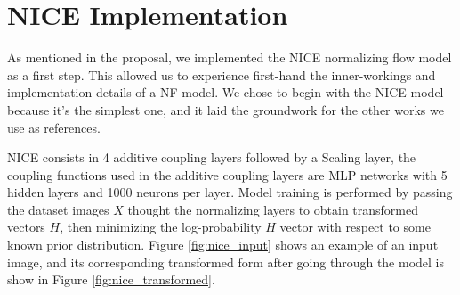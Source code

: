 \section{NICE Implementation}

As mentioned in the proposal, we implemented the NICE\cite{nice} normalizing flow model as a first step. This allowed us to experience first-hand the inner-workings and implementation details of a NF model. We chose to begin with the NICE model because it's the simplest one, and it laid the groundwork for the other works we use as references. 

NICE consists in 4 additive coupling layers followed by a Scaling layer, the coupling functions used in the additive coupling layers are MLP networks with 5 hidden layers and 1000 neurons per layer. Model training is performed by passing the dataset images $X$ thought the normalizing layers to obtain transformed vectors $H$, then minimizing the log-probability $H$ vector with respect to some known prior distribution. Figure \ref{fig:nice_input} shows an example of an input image, and its corresponding transformed form after going through the model is show in Figure \ref{fig:nice_transformed}.

